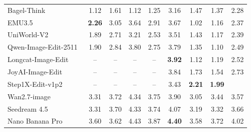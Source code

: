\documentclass{llmxive}
\begin{document}
\begin{table}[t]
{\begin{tabular}{l|cccc|cccc}
            Bagel-Think~\cite{deng2025emerging}
            & 1.12 & 1.61 & 1.12 & \cellcolor[HTML]{C8C8C8}1.25 & 3.16 & 1.47 & 1.37
            & \cellcolor[HTML]{C8C8C8} 2.28 \\

            EMU3.5~\cite{cui2025emu3}
            & \textbf{2.26} &  3.05  & 3.64 & \cellcolor[HTML]{C8C8C8}2.91 & 3.67 & 1.02 & 1.16
            & \cellcolor[HTML]{C8C8C8}2.37 \\

            

            UniWorld-V2~\cite{li2025uniworld}
            & 1.89 & 2.71 & 3.21 & \cellcolor[HTML]{C8C8C8}2.53 & 3.51 & 1.43 & 1.17
            & \cellcolor[HTML]{C8C8C8}2.39 \\

            Qwen-Image-Edit-2511~\cite{wu2025qwen}
            & 1.90 & 2.84 & 3.80 & \cellcolor[HTML]{C8C8C8}2.75 & 3.79 & 1.35 & 1.10
            & \cellcolor[HTML]{C8C8C8}2.49 \\

            Longcat-Image-Edit~\cite{team2025longcat}
            & -- & -- & -- & --
            & \textbf{3.92} & 1.12 & 1.19
            & \cellcolor[HTML]{C8C8C8}2.52 \\

            JoyAI-Image-Edit~\cite{joyaiimageedit}
            & -- & -- & -- & --
            &  3.84  & 1.73 & 1.54
            & \cellcolor[HTML]{C8C8C8}2.73 \\

            Step1X-Edit-v1p2~\cite{liu2025step1x}
            & -- & -- & -- & --
            & 3.43 & \textbf{2.21} & \textbf{1.99}
            & \cellcolor[HTML]{C8C8C8}{\textbf{2.76}} \\

           
        

            \midrule
            Wan2.7-image~\cite{nanobananapro}
            & 3.31 & 3.72 & 4.34 & \cellcolor[HTML]{C8C8C8}3.75 & 3.90 & 3.05 & 3.44
            & \cellcolor[HTML]{C8C8C8} 3.57 \\

            Seedream 4.5~\cite{seedream2025seedream}
            & 3.31 & 3.70 & 4.33 & \cellcolor[HTML]{C8C8C8}3.74 & 4.07 & 3.19 & 3.32
            & \cellcolor[HTML]{C8C8C8}3.66 \\

            Nano Banana Pro~\cite{nanobananapro}
            & 3.60 & 3.62 & 4.43 & \cellcolor[HTML]{C8C8C8}3.87 & {\textbf{4.40}} & 3.58 & 3.72
            & \cellcolor[HTML]{C8C8C8}4.02 \\


\end{tabular}}
\end{table}
\end{document}
